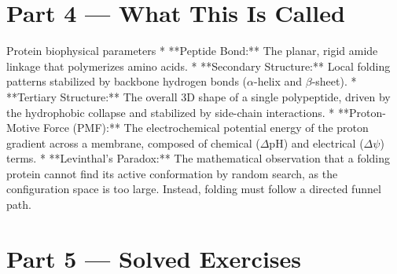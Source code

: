 \documentclass[12pt, a4paper]{book}
\begin{document}
\newpage

\section{Part 4 --- What This Is Called}

\begin{namedconcept}{Protein biophysical parameters}
* **Peptide Bond:** The planar, rigid amide linkage that polymerizes amino acids.
* **Secondary Structure:** Local folding patterns stabilized by backbone hydrogen bonds ($\alpha$-helix and $\beta$-sheet).
* **Tertiary Structure:** The overall 3D shape of a single polypeptide, driven by the hydrophobic collapse and stabilized by side-chain interactions.
* **Proton-Motive Force (PMF):** The electrochemical potential energy of the proton gradient across a membrane, composed of chemical ($\Delta\text{pH}$) and electrical ($\Delta\psi$) terms.
* **Levinthal's Paradox:** The mathematical observation that a folding protein cannot find its active conformation by random search, as the configuration space is too large. Instead, folding must follow a directed funnel path.
\end{namedconcept}

\newpage

\section{Part 5 --- Solved Exercises}
\end{document}
